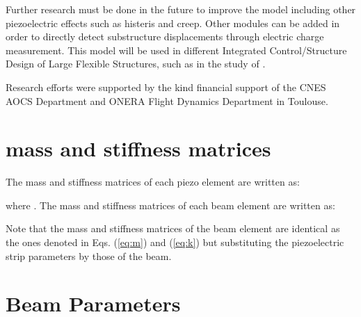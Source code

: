 \documentclass{ifacconf}
\begin{document}
Further research must be done in the future to improve the model including other piezoelectric effects such as histeris and creep. Other modules can be added in order to directly detect substructure displacements through electric charge measurement. This model will be used in different Integrated Control/Structure Design of Large Flexible Structures, such as in the study of \cite{Perez2016_ID}. 


\begin{ack}
Research efforts were supported by the kind financial support of the CNES AOCS Department and ONERA Flight Dynamics Department in Toulouse.
\end{ack}

             















\appendix

\section{mass and stiffness matrices}    \label{sec:appendix1}
The mass and stiffness matrices of each piezo element are written as:




where . The mass and stiffness matrices of each beam element are written as:




Note that the mass and stiffness matrices of the beam element are identical as the ones denoted in Eqs. (\ref{eq:m}) and (\ref{eq:k}) but substituting the piezoelectric strip parameters by those of the beam.


\section{Beam Parameters}              
\end{document}
